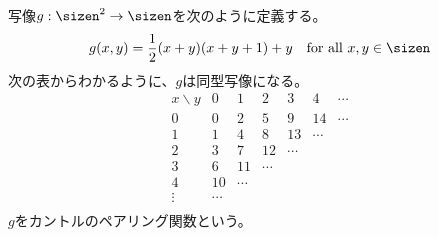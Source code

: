 	\begin{example}[カントルのペアリング関数]
	\label{eg:カントルのペアリング関数} %
		写像$g:\sizen^2\to\sizen$を次のように定義する。
		\begin{equation*}\begin{split}
			g(x, y) = \frac{1}{2}(x+y)(x+y+1) + y
			\quad\text{for all }x,y\in\sizen
		\end{split}\end{equation*}
		次の表からわかるように、$g$は同型写像になる。
		\begin{equation*}\begin{array}{c|cccccc}
			x\backslash y & 0 & 1 & 2 & 3 & 4 & \cdots \\ \hline
			0 & 0 & 2 & 5 & 9 & 14 & \cdots \\
			1 & 1 & 4 & 8 & 13 & \cdots \\
			2 & 3 & 7 & 12 & \cdots \\
			3 & 6 & 11 & \cdots \\
			4 & 10 & \cdots \\
			\vdots & \cdots \\
		\end{array}\end{equation*}
		$g$をカントルのペアリング関数という。
	\end{example} %
\endgroup %
